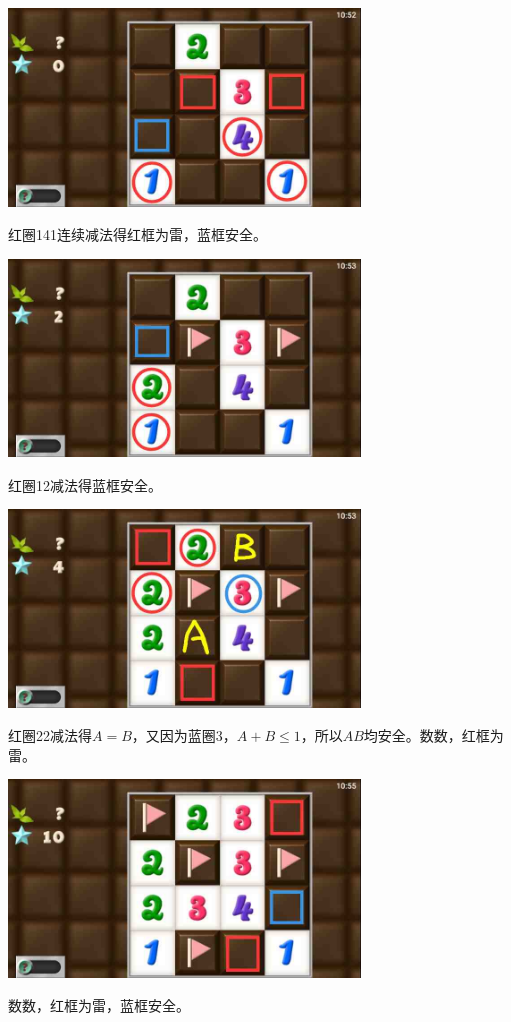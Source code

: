 \subsection{} %
\begin{center}
    \includegraphics[width=0.7\textwidth]{puzzlelow/123-1.jpg}
\end{center}
红圈141连续减法得红框为雷，蓝框安全。
\begin{center}
    \includegraphics[width=0.7\textwidth]{puzzlelow/123-2.jpg}
\end{center}
红圈12减法得蓝框安全。
\begin{center}
    \includegraphics[width=0.7\textwidth]{puzzlelow/123-3.jpg}
\end{center}
红圈22减法得$A=B$，又因为蓝圈3，$A+B\le 1$，所以$AB$均安全。数数，红框为雷。
\begin{center}
    \includegraphics[width=0.7\textwidth]{puzzlelow/123-4.jpg}
\end{center}
数数，红框为雷，蓝框安全。

